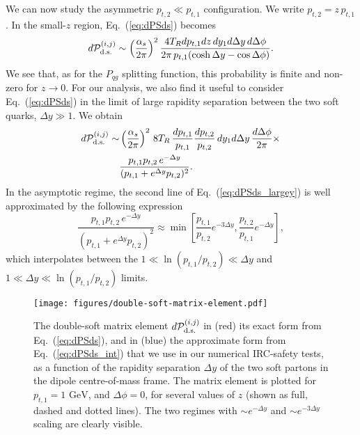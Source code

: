 \documentclass[nofootinbib,twocolumn,preprintnumbers,superscriptaddress,aps]{revtex4-2}
\newcommand{\as}{\alpha_s}
\newcommand{\GeV}{\,\text{GeV}}
\begin{document}
%
We can now study the asymmetric $p_{t,2}\ll p_{t,1}$ configuration. We write
$p_{t,2} = z \, p_{t,1}$. In the small-$z$ region, Eq.~(\ref{eq:dPSds})
becomes
\begin{equation}
  d\mathcal P^{(i,j)}_{\rm d.s.} \sim
  \left(\frac{\as}{2\pi}\right)^2
  \frac{4 T_R dp_{t,1} dz\, d y_1 d\Delta y\, d\Delta\phi}
  {2\pi\, p_{t,1}(\cosh\Delta y-\cos\Delta\phi)}.
\end{equation}
We see that, as for the $P_{qg}$ splitting function, this probability
is finite and non-zero for $z\to 0$. For our analysis, we also find it
useful to consider Eq.~(\ref{eq:dPSds}) in the limit of large rapidity
separation between the two soft quarks, $\Delta y \gg 1$. We obtain
\begin{align}
  \label{eq:dPSds_largey}
  d\mathcal P^{(i,j)}_{\rm d.s.} \sim
  &
  \left(\frac{\as}{2\pi}\right)^2\, 8 T_R\,
  \frac{dp_{t,1}}{p_{t,1}} \frac{dp_{t,2}}{p_{t,2}}
  \, d y_1 d\Delta y\, \frac{d\Delta\phi}{2\pi}
  \times
  \\
  \nonumber
  &
  \frac{p_{t,1} p_{t,2}\, e^{-\Delta y}}{(p_{t,1}+e^{\Delta y} p_{t,2})^2}.
\end{align}
In the asymptotic regime, the second line of Eq.~(\ref{eq:dPSds_largey}) is
well approximated by the following expression
\begin{equation}
  \frac{p_{t,1} p_{t,2}\, e^{-\Delta y}}{(p_{t,1}+e^{\Delta y} p_{t,2})^2}
  \approx \min\left[\frac{p_{t,1}}{p_{t,2}}e^{-3\Delta y},
    \frac{p_{t,2}}{p_{t,1}}e^{-\Delta y}\right],
\end{equation}
which interpolates between the $1\ll \ln(p_{t,1}/p_{t,2})\ll \Delta y $  and
$1\ll \Delta y \ll \ln(p_{t,1}/p_{t,2})$ limits.

\begin{figure}
  \centering
  \texttt{[image: figures/double-soft-matrix-element.pdf]}
  \caption{
  The double-soft matrix element $d\mathcal P^{(i,j)}_{\rm d.s.}$ in (red) its
  exact form from Eq.~(\ref{eq:dPSds}), and in (blue) the approximate
  form from Eq.~(\ref{eq:dPSds_int}) that we use in our numerical
  IRC-safety tests, as a
  function of the rapidity separation $\Delta y$ of the two soft partons in
  the dipole centre-of-mass frame.
  The matrix element is plotted for $p_{t,1}=1\,\GeV$, and $\Delta \phi = 0$, for several values of $z$
  (shown as full, dashed and dotted lines).
  The two regimes with $\sim e^{-\Delta y}$ and $\sim e^{-3\Delta y}$
  scaling are clearly visible.  }
  \label{fig:DS-approx}
\end{figure}
\end{document}
